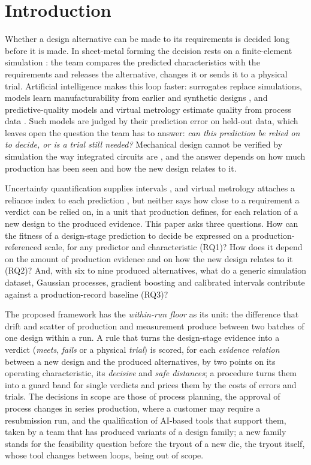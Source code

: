 \documentclass[pdflatex,sn-basic,lineno]{sn-jnl}
\begin{document}
\section{Introduction}\label{sec:intro}

Whether a design alternative can be made to its requirements is decided long before it is made. In sheet-metal forming the decision rests on a finite-element simulation \citep{banabic2010sheet}: the team compares the predicted characteristics with the requirements and releases the alternative, changes it or sends it to a physical trial. Artificial intelligence makes this loop faster: surrogates replace simulations, models learn manufacturability from earlier and synthetic designs \citep{yan2026machine, ghadai2018learning, ballegeer2026bendfm}, and predictive-quality models and virtual metrology estimate quality from process data \citep{tercan2022machine, dreyfus2022virtual}. Such models are judged by their prediction error on held-out data, which leaves open the question the team has to answer: \emph{can this prediction be relied on to decide, or is a trial still needed?} Mechanical design cannot be verified by simulation the way integrated circuits are \citep{whitney1996why}, and the answer depends on how much production has been seen and how the new design relates to it.

Uncertainty quantification supplies intervals \citep{nemani2023uncertainty}, and virtual metrology attaches a reliance index to each prediction \citep{cheng2008evaluating}, but neither says how close to a requirement a verdict can be relied on, in a unit that production defines, for each relation of a new design to the produced evidence. This paper asks three questions. How can the fitness of a design-stage prediction to decide be expressed on a production-referenced scale, for any predictor and characteristic (RQ1)? How does it depend on the amount of production evidence and on how the new design relates to it (RQ2)? And, with six to nine produced alternatives, what do a generic simulation dataset, Gaussian processes, gradient boosting and calibrated intervals contribute against a production-record baseline (RQ3)?

The proposed framework has the \emph{within-run floor} as its unit: the difference that drift and scatter of production and measurement produce between two batches of one design within a run. A rule that turns the design-stage evidence into a verdict (\emph{meets}, \emph{fails} or a physical \emph{trial}) is scored, for each \emph{evidence relation} between a new design and the produced alternatives, by two points on its operating characteristic, its \emph{decisive} and \emph{safe distances}; a procedure turns them into a guard band for single verdicts and prices them by the costs of errors and trials. The decisions in scope are those of process planning, the approval of process changes in series production, where a customer may require a resubmission run, and the qualification of AI-based tools that support them, taken by a team that has produced variants of a design family; a new family stands for the feasibility question before the tryout of a new die, the tryout itself, whose tool changes between loops, being out of scope.
\end{document}
